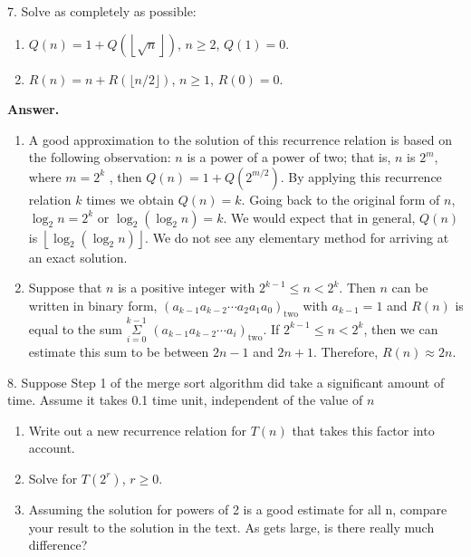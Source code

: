 \documentclass[10pt,]{book}
\theoremstyle{plain}
\theoremstyle{definition}
\theoremstyle{definition}
\theoremstyle{definition}
\theoremstyle{definition}
\numberwithin{equation}{section}
\begin{document}
\begin{exercisegroup}
\item[7.]\hypertarget{exercise-35}{}Solve as completely as possible:%
\par
\leavevmode%
\begin{enumerate}[label=\alph*]
\item\hypertarget{li-106}{} \(Q(n)=1+Q\left(\left\lfloor \sqrt{n}\right\rfloor \right)\), \(n \geq  2\), \(Q(1) = 0\).%
\item\hypertarget{li-107}{} \(R(n)=n +R(\lfloor n/2\rfloor )\), \(n \geq  1\), \(R(0) = 0\).%
\end{enumerate}
%
\par\smallskip
\par\smallskip
\noindent\textbf{Answer.}\hypertarget{answer-18}{}\quad
\leavevmode%
\begin{enumerate}[label=\alph*]
\item\hypertarget{li-108}{} A good approximation to the solution of this recurrence relation
 is based on the following observation: \(n\) is a power of a power of two; that is,
  \(n\) is \(2^m\), where \(m=2^k\) , then \(Q(n)=1+Q\left(2^{m/2}\right)\).
   By applying this recurrence relation \(k\) times we obtain \(Q(n)=k\).
    Going back to the original form of \(n\),
     \(\log _2n=2^k\) or \(\log _2\left(\log _2n\right)=k\).
      We would expect that in general, \(Q(n)\) is \(\left\lfloor \log _2\left(\log _2n\right)\right\rfloor\).
       We do not see any elementary method for arriving at an exact solution. %
\item\hypertarget{li-109}{} Suppose that \(n\) is a positive integer with \(2^{k-1} \leq n < 2^k\).
 Then \(n\) can be written in binary form, \(\left(a_{k-1}a_{k-2}\cdots  a_2a_1a_0\right)_{\textrm{two}}\)
  with \(a_{k-1}=1\) and \(R(n)\) is equal to the sum \(\underset{i=0}{\overset{k-1}{\Sigma }}\)
  \(\left(a_{k-1}a_{k-2}\cdots  a_i\right)_{\textrm{two}}\). If \(2^{k-1}\leq n < 2^k\),
   then we can estimate this sum to be between \(2n-1\) and \(2n+1\).
    Therefore, \(R(n)\approx 2n\).%
\end{enumerate}
%
\item[8.]\hypertarget{exercise-36}{}Suppose Step 1 of the merge sort algorithm did take a significant amount of time. Assume it takes 0.1 time unit, independent of the value of
\(n\)%
\par
\leavevmode%
\begin{enumerate}[label=\alph*]
\item\hypertarget{li-110}{}Write out a new recurrence relation for \(T(n)\) that takes this factor into account.%
\item\hypertarget{li-111}{} Solve for \(T\left(2^r\right)\), \(r \geq  0\).%
\item\hypertarget{li-112}{}Assuming the solution for powers of 2 is a good estimate for all n, compare your result to the solution in the text. As gets large, is there
really much difference?%
\end{enumerate}
%
\par\smallskip
\end{exercisegroup}
\par\smallskip\noindent
\typeout{************************************************}
\typeout{************************************************}
\end{document}
